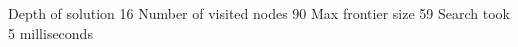 \documentclass{article}
\begin{document}
{}\newline

{}\newline

{}\newline

{\noindent Depth of solution 16\newline}
Number of visited nodes 90\newline
Max frontier size 59\newline
Search took 5 milliseconds\newline
\end{document}

